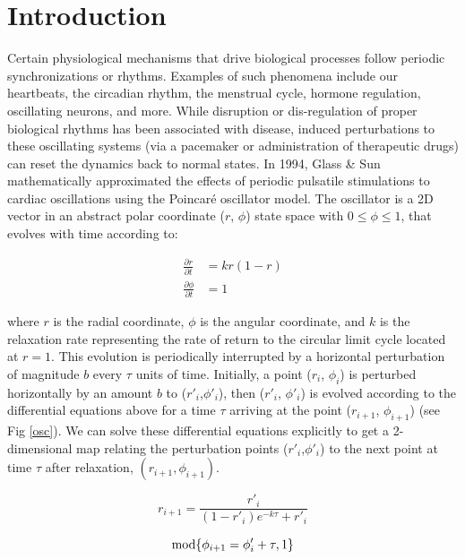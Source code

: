 \setlength{\parindent}{2em}

\section{Introduction}
\indent Certain physiological mechanisms that drive biological processes follow periodic synchronizations or rhythms. Examples of such phenomena include our heartbeats, the circadian rhythm, the menstrual cycle, hormone regulation, oscillating neurons, and more. While disruption or dis-regulation of proper biological rhythms has been associated with disease, induced perturbations to these oscillating systems (via a pacemaker or administration of therapeutic drugs) can reset the dynamics back to normal states\supercite{Glass2001}. 
\indent In 1994, Glass \& Sun\supercite{GLASS1994} mathematically approximated the effects of periodic pulsatile stimulations to cardiac oscillations using the Poincaré oscillator model. The oscillator is a 2D vector in an abstract  polar coordinate ($r$, $\phi$) state space with $0\leq \phi \leq 1$, that evolves with time according to:

\begin{align}
   \frac{\partial r}{\partial t} &= kr(1-r) \label{eqn: ODEs1}\\ 
   \frac{\partial \phi}{\partial t}&=1 \label{eqn: ODEs2}
\end{align}

\noindent where $r$ is the radial coordinate, $\phi$ is the angular coordinate, and $k$ is the relaxation rate representing the rate of return to the circular limit cycle located at $r=1$. This evolution is periodically interrupted by a horizontal perturbation of magnitude $b$ every $\tau$ units of time. Initially, a point ($r_i$, $\phi_i$) is perturbed horizontally by an amount $b$ to ($r'_i$,$\phi'_i$), then ($r'_i$, $\phi'_i$) is evolved according to the differential equations above for a time $\tau$ arriving at the point ($r_{i+1}$, $\phi_{i+1}$) (see Fig \ref{osc}). We can solve these differential equations explicitly to get a 2-dimensional map relating the  perturbation points ($r'_i$,$\phi'_i$) to the next point at time $\tau$ after relaxation, $(r_{i+1}, \phi_{i+1})$.

\begin{equation}
    r_{i+1} = \frac{r'_i}{(1 - r'_i)e^{-k\tau}+r'_i}
    \label{eqn:1}
\end{equation}

\begin{equation}
    \textnormal{mod} \{\phi_{i+1} = \phi_i' + \tau,1\}
    \label{eqn:2}
\end{equation}

